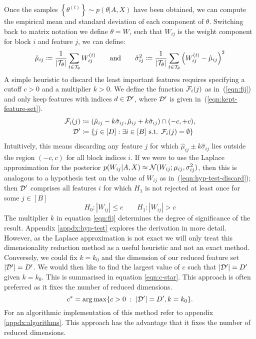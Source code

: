 Once the samples $\left\{ \theta^{(t)} \right\} \sim p(\theta | A, X)$
have been obtained, we can compute the empirical mean and standard deviation of each component of $\theta$. Switching back to matrix notation we define $\theta = W$, such that $W_{ij}$ is the weight component for block $i$ and feature $j$, we can define:
%
\begin{equation}
	\hat{\mu}_{ij} \coloneqq \frac{1}{|\mathcal{T}_\theta|} \sum_{t \in \mathcal{T}_\theta} W_{ij}^{(t)} \qquad \textrm{and} \qquad
	\hat{\sigma}_{ij}^2 \coloneqq \frac{1}{|\mathcal{T}_\theta|} \sum_{t \in \mathcal{T}_\theta} \left( W_{ij}^{(t)} - \hat{\mu}_{ij} \right)^2
\end{equation}
%
A simple heuristic to discard the least important features requires specifying a cutoff $c > 0$ and a multiplier $k > 0$. We define the function $\mathcal{F}_i(j)$ 
as in~(\ref{eqn:fij}) and only keep features with indices $d \in \mathcal{D}'$, where $\mathcal{D}'$ is given in~(\ref{eqn:kept-feature-set}).
%
\begin{align}
	\mathcal{F}_i(j) &\coloneqq (\hat{\mu}_{ij} - k \hat{\sigma}_{ij}, \hat{\mu}_{ij} + k \hat{\sigma}_{ij}) \cap (-c, +c),
	\label{eqn:fij} \\
	\mathcal{D}' &\coloneqq \left\{ j \in [D] : \exists i \in [B] \textrm{ s.t. }  \mathcal{F}_i(j) = \emptyset \right\}
	\label{eqn:kept-feature-set}
\end{align}
%
Intuitively, this means discarding any feature $j$ for which 
$\hat{\mu}_{ij} \pm k\hat{\sigma}_{ij}$ lies outside the region
$(-c, c)$ for all block indices $i$. If we were to use the Laplace approximation for the posterior $p(W_{ij} | A, X) \approx \mathcal{N}(W_{ij}; \mu_{ij}, \sigma_{ij}^2)$, then this is analogous to a hypothesis test on the value of $W_{ij}$ as in~(\ref{eqn:hyp-test-discard});
then $\mathcal{D}'$ comprises all features $i$ for which $H_1$ is not rejected at least once for some $j \in [B]$
%
\begin{equation}
	H_0: |W_{ij}| \leq c \qquad
	H_1: |W_{ij}| > c
	\label{eqn:hyp-test-discard}
\end{equation}
%
The multiplier $k$ in equation \ref{eqn:fij} determines the degree of significance of the result. Appendix \ref{appdx:hyp-test} explores the derivation in more detail. However, as the Laplace approximation is not exact we will only treat this dimensionality reduction method as a useful heuristic and not an exact method. Conversely, we could fix $k=k_0$ and the dimension of our reduced feature set $|\mathcal{D}'|=D'$. We would then like to find the largest value of $c$ such that $|\mathcal{D}'|=D'$ given $k=k_0$. This is summarised in equation \ref{eqn:c-star}. This approach is often preferred as it fixes the number of reduced dimensions.
%
\begin{equation}
	c^* = \operatorname*{arg\,max} \{c>0\; : \;|\mathcal{D}'| = D', k=k_0\}.
	\label{eqn:c-star}
\end{equation}
%
For an algorithmic implementation of this method refer to appendix \ref{appdx:algorithms}. This approach has the advantage that it fixes the number of reduced dimensions.
